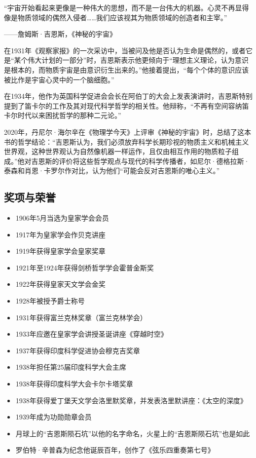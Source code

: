 “宇宙开始看起来更像是一种伟大的思想，而不是一台伟大的机器。心灵不再显得像是物质领域的偶然入侵者……我们应该视其为物质领域的创造者和主宰。”

——詹姆斯·吉恩斯，《神秘的宇宙》

在1931年《观察家报》的一次采访中，当被问及他是否认为生命是偶然的，或者它是“某个伟大计划的一部分”时，吉恩斯表示他更倾向于“理想主义理论，认为意识是根本的，而物质宇宙是由意识衍生出来的。”他接着提出，“每个个体的意识应该被比作是宇宙心灵中的一个脑细胞。”

在1934年，他作为英国科学促进会会长在阿伯丁的大会上发表演讲时，吉恩斯特别提到了笛卡尔的工作及其对现代科学哲学的相关性。他辩称，“不再有空间容纳笛卡尔时代以来困扰哲学的那种二元论。”

2020年，丹尼尔·海尔辛在《物理学今天》上评审《神秘的宇宙》时，总结了这本书的哲学结论：“吉恩斯认为，我们必须放弃科学长期珍视的物质主义和机械主义世界观，这种世界观认为自然像机器一样运作，且仅由相互作用的物质粒子组成。”他对吉恩斯的评价将这些哲学观点与现代的科学传播者，如尼尔·德格拉斯·泰森和肖恩·卡罗尔作对比，认为他们“可能会反对吉恩斯的唯心主义。”
\subsection{奖项与荣誉}  
\begin{itemize}
\item 1906年5月当选为皇家学会会员  
\item 1917年为皇家学会作贝克讲座  
\item 1919年获得皇家学会皇家奖章  
\item 1921年至1924年获得剑桥哲学学会霍普金斯奖  
\item 1922年获得皇家天文学会金奖  
\item 1928年被授予爵士称号  
\item 1931年获得富兰克林奖章（富兰克林学会）  
\item 1933年应邀在皇家学会讲授圣诞讲座《穿越时空》  
\item 1937年获得印度科学促进协会穆克吉奖章  
\item 1938年担任第25届印度科学大会主席  
\item 1938年获得印度科学大会卡尔卡塔奖章  
\item 1938年获得爱丁堡天文学会洛里默奖章，并发表洛里默讲座：《太空的深度》  
\item 1939年成为功勋勋章会员  
\item 月球上的“吉恩斯陨石坑”以他的名字命名，火星上的“吉恩斯陨石坑”也是如此  
\item 罗伯特·辛普森为纪念他诞辰百年，创作了《弦乐四重奏第七号》
\end{itemize}
